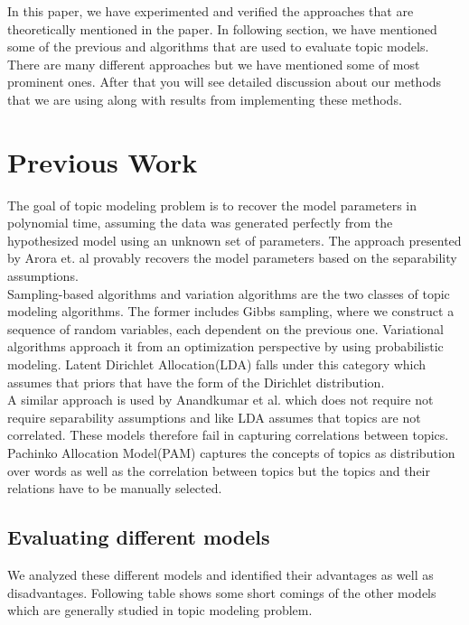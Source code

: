 \documentclass[a4paper,11pt]{article}
\begin{document}
In this paper, we have experimented and verified the approaches that are theoretically mentioned in the paper. In following section, we have mentioned some of the previous and algorithms that are used to evaluate topic models. There are many different approaches but we have mentioned some of most prominent ones. After that you will see detailed discussion about our methods that we are using along with results from implementing these methods. \\

\section{Previous Work}

The goal of topic modeling problem is to recover the model parameters in polynomial time, assuming the data was generated perfectly from the hypothesized model using an unknown set of parameters. The approach presented by Arora et. al \cite{tm} provably recovers the model parameters based on the separability assumptions. \\

Sampling-based algorithms and variation algorithms are the two classes of topic modeling algorithms. The former includes Gibbs sampling, where we construct a sequence of random variables, each dependent on the previous one. Variational algorithms approach it from an optimization perspective by using probabilistic modeling\cite{blei}. Latent Dirichlet Allocation(LDA) falls under this category which assumes that priors that have the form of the Dirichlet distribution.\\ 

A similar approach is used by Anandkumar et al\cite{anand12}. which does not require not require separability assumptions and like LDA assumes that topics are not correlated. These models therefore fail in capturing correlations between topics. Pachinko Allocation Model(PAM) captures the concepts of topics as distribution over words as well as the correlation between topics but the topics and their relations have to be manually selected\cite{pam}.

\subsection{Evaluating different models}
We analyzed these different models and identified their advantages as well as disadvantages. Following table shows some short comings of the other models which are generally studied in topic modeling problem.
\end{document}
